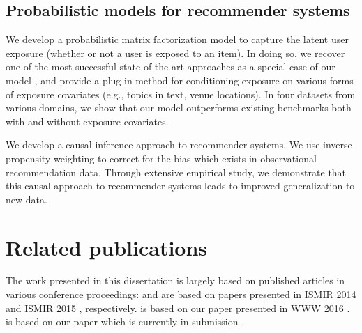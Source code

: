 \subsection{Probabilistic models for recommender systems}
We develop a probabilistic matrix factorization model to capture the latent user exposure (whether or not a user is exposed to an item). In doing so, we recover one of the most successful state-of-the-art approaches as a special case of our model
\citep{hu2008collaborative}, and provide a plug-in method for conditioning
exposure on various forms of exposure covariates (e.g., topics in text,
venue locations). In four datasets from various domains, we show that our model
outperforms existing benchmarks both with and
without exposure covariates. 

We develop a causal inference approach to recommender systems. 
We use inverse propensity weighting to correct for the bias which exists in observational recommendation data. Through extensive empirical study, we demonstrate that this causal approach to recommender systems leads to improved generalization to new data.


\section{Related publications}

The work presented in this dissertation is largely based on published articles in various conference proceedings:  and  are based on papers presented in ISMIR 2014 \citep{liang2014codebook} and ISMIR 2015 \citep{liang15content}, respectively.  is based on our paper presented in WWW 2016 \citep{Liang16exposure}.  is based on our paper which is currently in submission \citep{liang16causal}.
